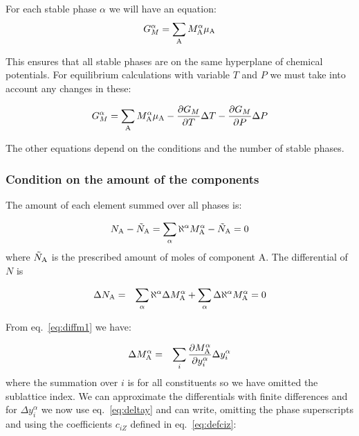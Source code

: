 \documentclass[12pt]{article}
\begin{document}
For each stable phase $\alpha$ we will have an equation:
\begin{equation}
G_M^{\alpha} = \sum_{\rm A} M^{\alpha}_{\rm A}\mu_{\rm A} \label{eq:gmalpha}
\end{equation}

This ensures that all stable phases are on the same hyperplane of
chemical potentials.  For equilibrium calculations with variable $T$
and $P$ we must take into account any changes in these:

\begin{equation}
G_M^{\alpha} = \sum_{\rm A} M^{\alpha}_{\rm A}\mu_{\rm A}
-\frac{\partial G_M}{\partial T}\Delta T
-\frac{\partial G_M}{\partial P}\Delta P\label{eq:gmalpha2}
\end{equation}

The other equations depend on the conditions and the number of stable
phases.

\subsubsection{Condition on the amount of the components}\label{sc:step2}

The amount of each element summed over all phases is:

\begin{equation}
N_{\rm A}- {\tilde N_{\rm A}} = \sum_{\alpha}
\aleph^{\alpha}M^{\alpha}_{\rm A} - {\tilde N_{\rm A}}=0\label{eq:totaln}
\end{equation}
where ${\tilde N_{\rm A}}$ is the prescribed amount of moles of
component A.  The differential of $N$ is

\begin{eqnarray}
\Delta N_{\rm A}&=&\sum_{\alpha} \aleph^{\alpha}\Delta M^{\alpha}_{\rm A}+
\sum_{\alpha} \Delta \aleph^{\alpha}M^{\alpha}_{\rm A} = 0\label{eq:diffN1}
\end{eqnarray}

From eq.~\ref{eq:diffm1} we have:

\begin{eqnarray}
\Delta M_{\rm A}^{\alpha} &=&
\sum_i \frac{\partial M_{\rm A}^{\alpha}}{\partial y_i^{\alpha}}
\Delta y_i^{\alpha}
\end{eqnarray}
where the summation over $i$ is for all constituents so we have
omitted the sublattice index.  We can approximate the differentials
with finite differences and for $\Delta y_i^{\alpha}$ we now use
eq.~\ref{eq:deltay} and can write, omitting the phase superscripts and
using the coefficients $c_{iZ}$ defined in eq.~\ref{eq:defciz}:
\end{document}
